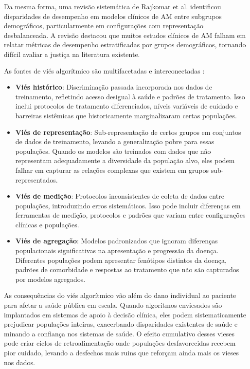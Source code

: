 Da mesma forma, uma revisão sistemática de Rajkomar et al. \cite{rajkomar2018} 
identificou disparidades de desempenho em modelos clínicos de AM entre 
subgrupos demográficos, particularmente em configurações com representação 
desbalanceada. A revisão destacou que muitos estudos clínicos de AM falham 
em relatar métricas de desempenho estratificadas por grupos demográficos, 
tornando difícil avaliar a justiça na literatura existente.

As fontes de viés algorítmico são multifacetadas e interconectadas 
\cite{mehrabi2021}:

\begin{itemize}[leftmargin=*]
    \item \textbf{Viés histórico}: Discriminação passada incorporada nos dados 
          de treinamento, refletindo acesso desigual à saúde e padrões de 
          tratamento. Isso inclui protocolos de tratamento diferenciados, 
          níveis variáveis de cuidado e barreiras sistêmicas que historicamente 
          marginalizaram certas populações.
    \item \textbf{Viés de representação}: Sub-representação de certos grupos 
          em conjuntos de dados de treinamento, levando a generalização 
          pobre para essas populações. Quando os modelos são treinados com 
          dados que não representam adequadamente a diversidade da população 
          alvo, eles podem falhar em capturar as relações complexas que 
          existem em grupos sub-representados.
    \item \textbf{Viés de medição}: Protocolos inconsistentes de coleta de 
          dados entre populações, introduzindo erros sistemáticos. Isso pode 
          incluir diferenças em ferramentas de medição, protocolos e padrões 
          que variam entre configurações clínicas e populações.
    \item \textbf{Viés de agregação}: Modelos padronizados que ignoram 
          diferenças populacionais significativas na apresentação e progressão 
          da doença. Diferentes populações podem apresentar fenótipos 
          distintos da doença, padrões de comorbidade e respostas ao 
          tratamento que não são capturados por modelos agregados.
\end{itemize}

As consequências do viés algorítmico vão além do dano individual ao paciente 
para afetar a saúde pública em escala. Quando algoritmos enviesados são 
implantados em sistemas de apoio à decisão clínica, eles podem 
sistematicamente prejudicar populações inteiras, exacerbando disparidades 
existentes de saúde e minando a confiança nos sistemas de saúde. O efeito 
cumulativo desses vieses pode criar ciclos de retroalimentação onde 
populações desfavorecidas recebem pior cuidado, levando a desfechos mais 
ruins que reforçam ainda mais os vieses nos dados.

